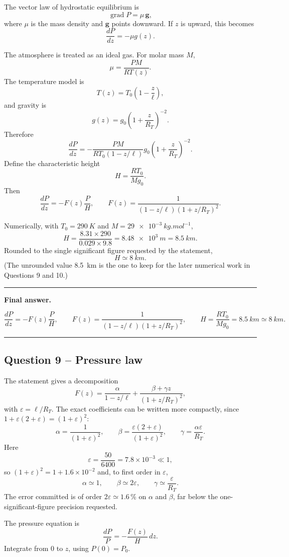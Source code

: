 \documentclass[11pt,a4paper]{article}
\newenvironment{finalanswer}{%
  \begin{center}\begin{minipage}{0.94\linewidth}\hrule\vspace{0.45em}\textbf{Final answer. }%
}{%
  \vspace{0.45em}\hrule\end{minipage}\end{center}%
}
\newcommand{\grad}{\operatorname{grad}}
\newcommand{\RT}{R_T}
\begin{document}
The vector law of hydrostatic equilibrium is
\[
 \grad P=\mu\,\mathbf{g},
\]
where $\mu$ is the mass density and $\mathbf{g}$ points downward. If $z$ is upward, this becomes
\[
 \frac{dP}{dz}=-\mu g(z).
\]

The atmosphere is treated as an ideal gas. For molar mass $M$,
\[
 \mu=\frac{PM}{RT(z)}.
\]
The temperature model is
\[
 T(z)=T_0\left(1-\frac{z}{\ell}\right),
\]
and gravity is
\[
 g(z)=g_0\left(1+\frac{z}{\RT}\right)^{-2}.
\]
Therefore
\[
 \frac{dP}{dz}
 =-\frac{PM}{RT_0(1-z/\ell)}g_0\left(1+\frac{z}{\RT}\right)^{-2}.
\]
Define the characteristic height
\[
 H=\frac{RT_0}{Mg_0}.
\]
Then
\[
 \frac{dP}{dz}=-F(z)\frac{P}{H},
 \qquad
 F(z)=\frac{1}{(1-z/\ell)(1+z/\RT)^2}.
\]

Numerically, with $T_0=\SI{290}{K}$ and $M=\SI{29e-3}{kg.mol^{-1}}$,
\[
 H=\frac{8.31\times 290}{0.029\times9.8}=\SI{8.48e3}{m}=\SI{8.5}{km}.
\]
Rounded to the single significant figure requested by the statement,
\[
 H\simeq\SI{8}{km}.
\]
(The unrounded value \SI{8.5}{km} is the one to keep for the later numerical
work in Questions 9 and 10.)

\begin{finalanswer}
\[
\frac{dP}{dz}=-F(z)\frac{P}{H},\qquad
F(z)=\frac{1}{(1-z/\ell)(1+z/\RT)^2},\qquad
H=\frac{RT_0}{Mg_0}=\SI{8.5}{km}\simeq\SI{8}{km}.
\]
\end{finalanswer}

\subsection*{Question 9 -- Pressure law}

The statement gives a decomposition
\[
F(z)=\frac{\alpha}{1-z/\ell}+\frac{\beta+\gamma z}{(1+z/\RT)^2},
\]
with $\varepsilon=\ell/\RT$. The exact coefficients can be written more compactly,
since $1+\varepsilon(2+\varepsilon)=(1+\varepsilon)^2$:
\[
 \alpha=\frac{1}{(1+\varepsilon)^2},
 \qquad
 \beta=\frac{\varepsilon(2+\varepsilon)}{(1+\varepsilon)^2},
 \qquad
 \gamma=\frac{\alpha\varepsilon}{\RT}.
\]
Here
\[
 \varepsilon=\frac{50}{6400}=7.8\times10^{-3}\ll1,
\]
so $(1+\varepsilon)^2=1+1.6\times10^{-2}$ and, to first order in $\varepsilon$,
\[
\alpha\simeq1,
\qquad
\beta\simeq2\varepsilon,
\qquad
\gamma\simeq\frac{\varepsilon}{\RT}.
\]
The error committed is of order $2\varepsilon\simeq1.6\,\%$ on $\alpha$ and
$\beta$, far below the one-significant-figure precision requested.

The pressure equation is
\[
 \frac{dP}{P}=-\frac{F(z)}{H}\,dz.
\]
Integrate from $0$ to $z$, using $P(0)=P_0$.
\end{document}
